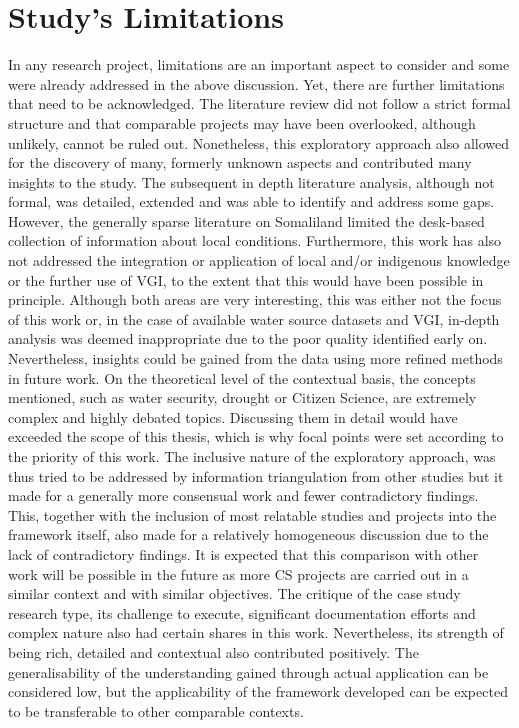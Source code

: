 \section{Study's Limitations}
In any research project, limitations are an important aspect to consider and some were already addressed in the above discussion. Yet, there are further limitations that need to be acknowledged. The literature review did not follow a strict formal structure and that comparable projects may have been overlooked, although unlikely, cannot be ruled out. Nonetheless, this exploratory approach also allowed for the discovery of many, formerly unknown aspects and contributed many insights to the study. The subsequent in depth literature analysis, although not formal, was detailed, extended and was able to identify and address some gaps. However, the generally sparse literature on Somaliland limited the desk-based collection of information about local conditions. Furthermore, this work has also not addressed the integration or application of local and/or indigenous knowledge or the further use of VGI, to the extent that this would have been possible in principle. Although both areas are very interesting, this was either not the focus of this work or, in the case of available water source datasets and VGI, in-depth analysis was deemed inappropriate due to the poor quality identified early on. Nevertheless, insights could be gained from the data using more refined methods in future work. On the theoretical level of the contextual basis, the concepts mentioned, such as water security, drought or Citizen Science, are extremely complex and highly debated topics. Discussing them in detail would have exceeded the scope of this thesis, which is why focal points were set according to the priority of this work.\newline
The inclusive nature of the exploratory approach, was thus tried to be addressed by information triangulation from other studies but it made for a generally more consensual work and fewer contradictory findings. This, together with the inclusion of most relatable studies and projects into the framework itself, also made for a relatively homogeneous discussion due to the lack of contradictory findings. It is expected that this comparison with other work will be possible in the future as more CS projects are carried out in a similar context and with similar objectives.\newline
The critique of the case study research type, its challenge to execute, significant documentation efforts and complex nature also had certain shares in this work. Nevertheless, its strength of being rich, detailed and contextual also contributed positively. The generalisability of the understanding gained through actual application can be considered low, but the applicability of the framework developed can be expected to be transferable to other comparable contexts.\newline
